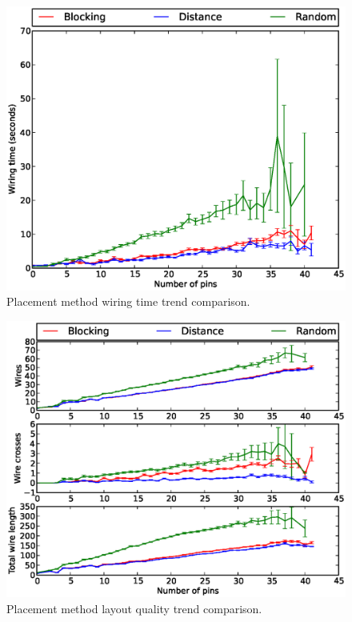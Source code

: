 \begin{figure}[H]
\begin{center}
\includegraphics[width=\textwidth]{Images/placement_time_trend_comparison.eps}
\caption[Placement method wiring time trend comparison]{Placement method wiring
time trend comparison.}
\label{fig:placement_time_trend}
\end{center}
\end{figure}

\begin{figure}
\begin{center}
\includegraphics[width=\textwidth]{Images/placement_quality_trend_comparison.eps}
\caption[Placement method layout quality trend comparison]{Placement method
layout quality trend comparison.}
\label{fig:placement_quality_trend}
\end{center}
\end{figure}

